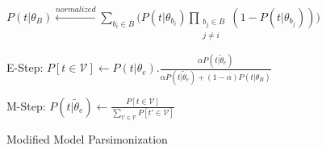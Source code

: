\begin{algorithm}[t!]
\begin{algorithmic}[1]
     \State \begin{small}$P(t|\theta_B) \xleftarrow{normalized} \sum_{b_i\in B} \bigg(P(t|\theta_{b_i}) \prod_{\substack{b_j\in B \\ j \neq i}} (1-P(t|\theta_{b_j}))\bigg)$ \end{small}
     \Repeat
         \State \begin{small}E-Step: $P[t\in \mathcal{V}] \gets P(t|\theta_e).\frac{\alpha P(t|\tilde{\theta}_e)}{\alpha P(t|\tilde{\theta}_e) + (1-\alpha) P(t|\theta_B)}$ \end{small}
          \State \begin{small}M-Step: $P(t|\tilde{\theta}_e) \gets \frac{ P[t \in \mathcal{V}]}{\sum_{t' \in \mathcal{V}} P[t' \in \mathcal{V}]}$ \end{small}
 \EndFor
 \EndProcedure
 \end{algorithmic}
 \caption{\label{alg:model_parsimonization}Modified Model Parsimonization}
\end{algorithm}
